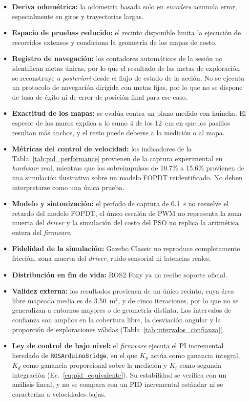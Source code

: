 \begin{itemize}
\item \textbf{Deriva odométrica:} la odometría basada solo en \textit{encoders} acumula error, especialmente en giros y trayectorias largas.
\item \textbf{Espacio de pruebas reducido:} el recinto disponible limita la ejecución de recorridos extensos y condiciona la geometría de los mapas de costo.
\item \textbf{Registro de navegación:} los contadores automáticos de la sesión no identifican metas únicas, por lo que el resultado de las metas de exploración se reconstruye \textit{a posteriori} desde el flujo de estado de la acción. No se ejecuta un protocolo de navegación dirigida con metas fijas, por lo que no se dispone de tasa de éxito ni de error de posición final para ese caso.
\item \textbf{Exactitud de los mapas:} se evalúa contra un plano medido con huincha. El espesor de los muros explica a lo sumo 4 de los 12~cm en que los pasillos resultan más anchos, y el resto puede deberse a la medición o al mapa.
\item \textbf{Métricas del control de velocidad:} los indicadores de la Tabla~\ref{tab:pid_performance} provienen de la captura experimental en \textit{hardware} real, mientras que los sobreimpulsos de 10.7\% a 15.6\% provienen de una simulación ilustrativa sobre un modelo FOPDT reidentificado. No deben interpretarse como una única prueba.
\item \textbf{Modelo y sintonización:} el período de captura de 0.1~s no resuelve el retardo del modelo FOPDT, el único escalón de PWM no representa la zona muerta del \textit{driver} y la simulación del costo del PSO no replica la aritmética entera del \textit{firmware}.
\item \textbf{Fidelidad de la simulación:} Gazebo Classic no reproduce completamente fricción, zona muerta del \textit{driver}, ruido sensorial ni latencias reales.
\item \textbf{Distribución en fin de vida:} \gls{ROS2} Foxy ya no recibe soporte oficial.
\item \textbf{Validez externa:} los resultados provienen de un único recinto, cuya área libre mapeada media es de 3.50~m$^2$, y de cinco iteraciones, por lo que no se generalizan a entornos mayores o de geometría distinta. Los intervalos de confianza son amplios en la cobertura libre, la desviación angular y la proporción de exploraciones válidas (Tabla~\ref{tab:intervalos_confianza}).
\item \textbf{Ley de control de bajo nivel:} el \textit{firmware} ejecuta el PI incremental heredado de \texttt{ROSArduinoBridge}, en el que $K_p$ actúa como ganancia integral, $K_d$ como ganancia proporcional sobre la medición y $K_i$ como segunda integración (Ec.~\eqref{eq:pid_equivalente}). Su estabilidad se verifica con un análisis lineal, y no se compara con un PID incremental estándar ni se caracteriza a velocidades bajas.

\end{itemize}
